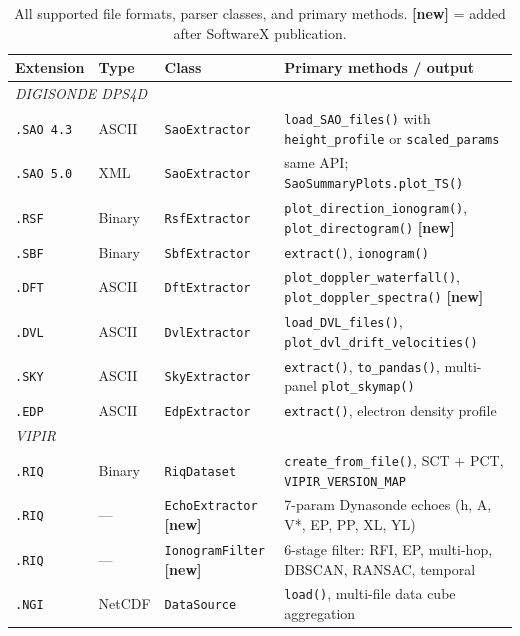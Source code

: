 \documentclass[a4paper,11pt]{article}
\begin{document}
\begin{table}[H]
  \centering
  \caption{All supported file formats, parser classes, and primary methods.
           \textbf{[new]} = added after SoftwareX publication.}
  \small
  \begin{tabular}{lllp{5cm}}
    \toprule
    Extension & Type & Class & Primary methods / output \\
    \midrule
    \multicolumn{4}{l}{\textit{DIGISONDE DPS4D}} \\
    \texttt{.SAO 4.3} & ASCII  & \texttt{SaoExtractor}  & \texttt{load\_SAO\_files()} with \texttt{height\_profile} or \texttt{scaled\_params} \\
    \texttt{.SAO 5.0} & XML    & \texttt{SaoExtractor}  & same API; \texttt{SaoSummaryPlots.plot\_TS()} \\
    \texttt{.RSF}     & Binary & \texttt{RsfExtractor}  & \texttt{plot\_direction\_ionogram()}, \texttt{plot\_directogram()} \textbf{[new]} \\
    \texttt{.SBF}     & Binary & \texttt{SbfExtractor}  & \texttt{extract()}, \texttt{ionogram()} \\
    \texttt{.DFT}     & ASCII  & \texttt{DftExtractor}  & \texttt{plot\_doppler\_waterfall()}, \texttt{plot\_doppler\_spectra()} \textbf{[new]} \\
    \texttt{.DVL}     & ASCII  & \texttt{DvlExtractor}  & \texttt{load\_DVL\_files()}, \texttt{plot\_dvl\_drift\_velocities()} \\
    \texttt{.SKY}     & ASCII  & \texttt{SkyExtractor}  & \texttt{extract()}, \texttt{to\_pandas()}, multi-panel \texttt{plot\_skymap()} \\
    \texttt{.EDP}     & ASCII  & \texttt{EdpExtractor}  & \texttt{extract()}, electron density profile \\
    \midrule
    \multicolumn{4}{l}{\textit{VIPIR}} \\
    \texttt{.RIQ}     & Binary & \texttt{RiqDataset}    & \texttt{create\_from\_file()}, SCT + PCT, \texttt{VIPIR\_VERSION\_MAP} \\
    \texttt{.RIQ}     & —      & \texttt{EchoExtractor} \textbf{[new]} & 7-param Dynasonde echoes (h, A, V*, EP, PP, XL, YL) \\
    \texttt{.RIQ}     & —      & \texttt{IonogramFilter} \textbf{[new]} & 6-stage filter: RFI, EP, multi-hop, DBSCAN, RANSAC, temporal \\
    \texttt{.NGI}     & NetCDF & \texttt{DataSource}    & \texttt{load()}, multi-file data cube aggregation \\

\end{tabular}
\end{table}
\end{document}
